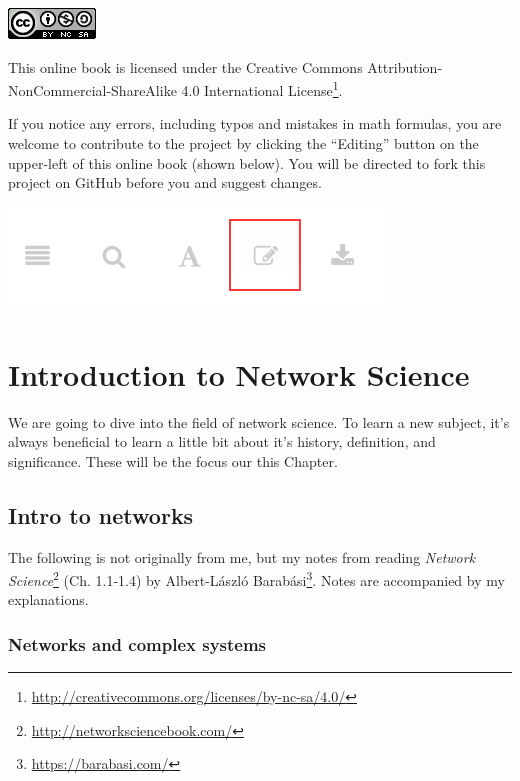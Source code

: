 \documentclass[
]{krantz}
\makeatletter
\renewcommand{\href}[2]{#2\footnote{\url{#1}}}
\newenvironment{kframe}{%
\medskip{}
\setlength{\fboxsep}{.8em}
 \def\at@end@of@kframe{}%
 \ifinner\ifhmode%
  \def\at@end@of@kframe{\end{minipage}}%
  \begin{minipage}{\columnwidth}%
 \fi\fi%
 \def\FrameCommand##1{\hskip\@totalleftmargin \hskip-\fboxsep
 \colorbox{shadecolor}{##1}\hskip-\fboxsep
     \hskip-\linewidth \hskip-\@totalleftmargin \hskip\columnwidth}%
 \MakeFramed {\advance\hsize-\width
   \@totalleftmargin\z@ \linewidth\hsize
   \@setminipage}}%
 {\par\unskip\endMakeFramed%
 \at@end@of@kframe}
\newenvironment{rmdblock}[1]
  {
  \begin{itemize}
  \renewcommand{\labelitemi}{
    \raisebox{-.7\height}[0pt][0pt]{
      {\setkeys{Gin}{width=3em,keepaspectratio}\texttt{[image: images/\#1]}}
    }
  }
  \setlength{\fboxsep}{1em}
  \begin{kframe}
  \item
  }
  {
  \end{kframe}
  \end{itemize}
  }
\newenvironment{rmdnote}
  {\begin{rmdblock}{note}}
  {\end{rmdblock}}
\makeatother
\begin{document}
\includegraphics{images/license.png}

This online book is licensed under the \href{http://creativecommons.org/licenses/by-nc-sa/4.0/}{Creative Commons Attribution-NonCommercial-ShareAlike 4.0 International License}.

If you notice any errors, including typos and mistakes in math formulas, you are welcome to contribute to the project by clicking the ``Editing'' button on the upper-left of this online book (shown below). You will be directed to fork this project on GitHub before you and suggest changes.

\begin{center}\includegraphics[width=0.45\linewidth]{images/edit} \end{center}

\mainmatter

\hypertarget{intro}{%
\chapter{Introduction to Network Science}\label{intro}}

We are going to dive into the field of network science. To learn a new subject, it's always beneficial to learn a little bit about it's history, definition, and significance. These will be the focus our this Chapter.

\hypertarget{intro-to-networks}{%
\section{Intro to networks}\label{intro-to-networks}}

\begin{rmdnote}
The following is not originally from me, but my notes from reading \href{http://networksciencebook.com/}{\emph{Network Science}} (Ch. 1.1-1.4) by \href{https://barabasi.com/}{Albert-László Barabási}. Notes are accompanied by my explanations.
\end{rmdnote}

\hypertarget{networks-and-complex-systems}{%
\subsection{Networks and complex systems}\label{networks-and-complex-systems}}
\end{document}
